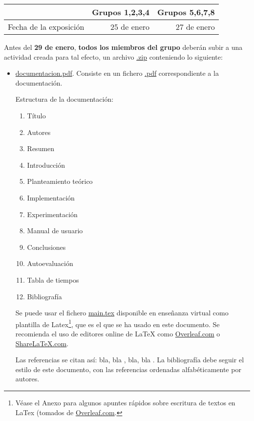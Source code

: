 \documentclass[a4paper]{article}
\begin{document}
\begin{center}
    \begin{tabular}{|c||r|r|}
    \hline
     &Grupos 1,2,3,4 & Grupos 5,6,7,8\\
    \hline\hline
  Fecha de la exposición & 25 de enero & 27 de enero \\
\hline
    \end{tabular}
    \end{center}

Antes del  \textbf{29 de enero}, \textbf{todos los miembros del grupo} deberán subir a una actividad creada para tal efecto, un archivo \url{.zip} conteniendo lo siguiente:

 \begin{itemize}
\item \url{documentacion.pdf}. Consiste en un fichero \url{.pdf} correspondiente a la documentación. 

Estructura de la documentación:

\begin{enumerate}
\item[]  Título
\item[]  Autores
\item[]  Resumen
\item  Introducción 
\item  Planteamiento teórico 
\item  Implementación
\item  Experimentación
\item  Manual de usuario
\item  Conclusiones
\item Autoevaluación
\item  Tabla de tiempos
\item[]  Bibliografía
\end{enumerate}

Se puede usar el fichero \url{main.tex} disponible en enseñanza virtual como plantilla de Latex\footnote{Véase el Anexo para algunos apuntes rápidos sobre escritura de textos en LaTex (tomados de \url{Overleaf.com}.}, que es el que se ha usado en este documento. Se recomienda el uso de editores online de LaTeX como \url{Overleaf.com} o \url{ShareLaTeX.com}.

Las referencias se citan así:
bla, bla \cite{clave:revista}, bla, bla \cite{clave:libro}. La bibliografía
debe seguir el estilo de este documento, con las referencias ordenadas alfabéticamente por autores.


\end{itemize}
\end{document}

